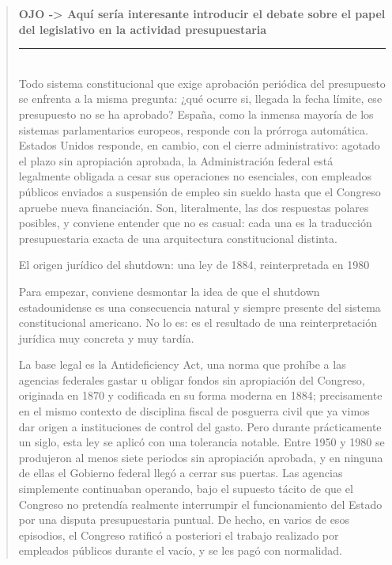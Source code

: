\documentclass[10pt,a4paper]{article}
\newenvironment{specialblock}[1]{%
      \begin{quote} %
      \small %
      \noindent\textbf{#1}\\[-0.3em] %
      \rule{\linewidth}{0.4pt}\\[0.6em]}{
      \end{quote}}
\begin{document}
\begin{specialblock}{\textbf{OJO ->} Aquí sería interesante introducir el debate sobre el papel del legislativo en la actividad presupuestaria}
    
    Todo sistema constitucional que exige aprobación periódica del presupuesto se enfrenta a la misma pregunta: ¿qué ocurre si, llegada la fecha límite, ese presupuesto no se ha aprobado? España, como la inmensa mayoría de los sistemas parlamentarios europeos, responde con la prórroga automática. Estados Unidos responde, en cambio, con el cierre administrativo: agotado el plazo sin apropiación aprobada, la Administración federal está legalmente obligada a cesar sus operaciones no esenciales, con empleados públicos enviados a suspensión de empleo sin sueldo hasta que el Congreso apruebe nueva financiación. Son, literalmente, las dos respuestas polares posibles, y conviene entender que no es casual: cada una es la traducción presupuestaria exacta de una arquitectura constitucional distinta.
    
    El origen jurídico del shutdown: una ley de 1884, reinterpretada en 1980
    
    Para empezar, conviene desmontar la idea de que el shutdown estadounidense es una consecuencia natural y siempre presente del sistema constitucional americano. No lo es: es el resultado de una reinterpretación jurídica muy concreta y muy tardía. 
    
    La base legal es la Antideficiency Act, una norma que prohíbe a las agencias federales gastar u obligar fondos sin apropiación del Congreso, originada en 1870 y codificada en su forma moderna en 1884; precisamente en el mismo contexto de disciplina fiscal de posguerra civil que ya vimos dar origen a instituciones de control del gasto. Pero durante prácticamente un siglo, esta ley se aplicó con una tolerancia notable. Entre 1950 y 1980 se produjeron al menos siete periodos sin apropiación aprobada, y en ninguna de ellas el Gobierno federal llegó a cerrar sus puertas. Las agencias simplemente continuaban operando, bajo el supuesto tácito de que el Congreso no pretendía realmente interrumpir el funcionamiento del Estado por una disputa presupuestaria puntual. De hecho, en varios de esos episodios, el Congreso ratificó a posteriori el trabajo realizado por empleados públicos durante el vacío, y se les pagó con normalidad.
    

\end{specialblock}
\end{document}
